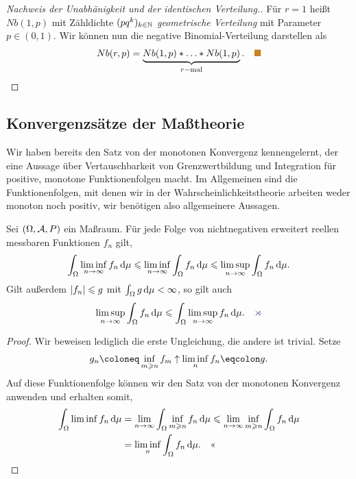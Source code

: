 \begin{bsp}
\begin{proof}[Nachweis der Unabhänigkeit und der identischen Verteilung.]
Für $r=1$ heißt $Nb(1,p)$ mit Zähldichte $(pq^k)_{k\in\N}$ \emph{geometrische
Verteilung} mit Parameter $p\in(0,1)$. Wir können nun die negative
Binomial-Verteilung darstellen als
\begin{align*}
Nb(r,p) = \underbrace{Nb(1,p)*\ldots*Nb(1,p)}_{r-\text{mal}}.\bsphere
\end{align*}
\end{proof}
\end{bsp}

\subsection{Konvergenzsätze der Maßtheorie}

Wir haben bereits den Satz von der monotonen Konvergenz kennengelernt, der eine
Aussage über Vertauschbarkeit von Grenzwertbildung und Integration für 
positive, monotone Funktionenfolgen macht. Im Allgemeinen sind die
Funktionenfolgen, mit denen wir in der Wahrscheinlichkeitstheorie arbeiten
weder monoton noch positiv, wir benötigen also allgemeinere Aussagen.

\begin{lemn}
Sei $(\Omega,\AA,P)$ ein Maßraum. Für jede Folge von nichtnegativen erweitert
reellen messbaren Funktionen $f_n$ gilt,
\begin{align*}
\int_\Omega \liminf\limits_{n\to\infty} f_n\dmu \le \liminf\limits_{n\to\infty}
\int_\Omega f_n\dmu \le
\limsup\limits_{n\to\infty}
\int_\Omega f_n\dmu.
\end{align*}
Gilt außerdem $\abs{f_n}\le g$ mit $\int_\Omega g \dmu < \infty$, so gilt auch
\begin{align*}
\limsup\limits_{n\to\infty}
\int_\Omega f_n\dmu
\le
\int_\Omega \limsup\limits_{n\to\infty}f_n\dmu.\fishhere
\end{align*} 
\end{lemn}
\begin{proof}
Wir beweisen lediglich die erste Ungleichung, die andere ist trivial. Setze
\begin{align*}
g_n \defl \inf\limits_{m\ge n} f_m \uparrow \liminf_n f_n \defr g.
\end{align*}
Auf diese Funktionenfolge können wir den Satz von der monotonen Konvergenz
anwenden und erhalten somit,
\begin{align*}
\int_{\Omega} \liminf f_n \dmu &= \lim\limits_{n\to\infty}
\int_\Omega
\inf\limits_{m\ge n} f_n \dmu
\le
\lim_{n\to\infty}
\inf\limits_{m\ge n} 
\int_\Omega
 f_n \dmu\\
 &=
 \liminf_{n} 
\int_\Omega
 f_n \dmu.\qedhere
\end{align*}
\end{proof}


